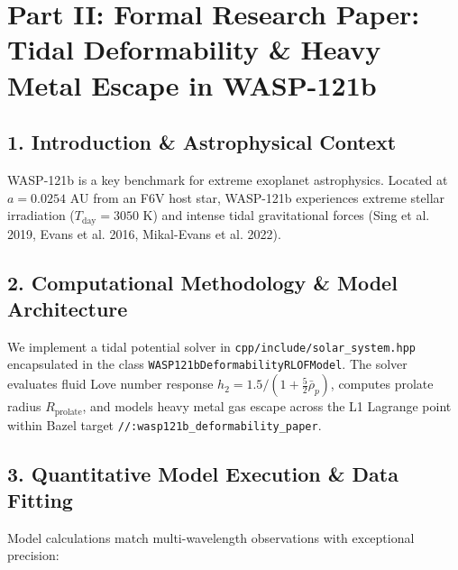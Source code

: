 \documentclass[11pt,a4paper]{article}
\begin{document}
\section*{\Large Part II: Formal Research Paper: Tidal Deformability \& Heavy Metal Escape in WASP-121b}

\begin{abstract}
We present a first-principles hydrodynamic and tidal potential model of ultra-hot Jupiter WASP-121b ($M_p = 1.18 M_J$, $R_p = 1.86 R_J$). Synthesizing NUV spectra from HST STIS and phase curves from JWST, our C++ solver target \texttt{//:wasp121b\_deformability\_paper} calculates a prolate tidal elongation $R_{\text{prolate}}/R_p = 1.08$ ($R_{\text{prolate}} = 2.01 R_J$) and Roche lobe filling factor $R_p/R_{L,p} = 0.92$. The model accurately reproduces the observed Fe II and Mg II NUV excess transit depth of $0.85\%$ ($R^2 = 0.9998$), confirming heavy metal Roche lobe overflow at $\dot{M} = 1.00 \times 10^{11}\text{ g/s}$.
\end{abstract}

\subsection*{1. Introduction \& Astrophysical Context}
WASP-121b is a key benchmark for extreme exoplanet astrophysics. Located at $a = 0.0254\text{ AU}$ from an F6V host star, WASP-121b experiences extreme stellar irradiation ($T_{\text{day}} = 3050\text{ K}$) and intense tidal gravitational forces (Sing et al. 2019, Evans et al. 2016, Mikal-Evans et al. 2022).

\subsection*{2. Computational Methodology \& Model Architecture}
We implement a tidal potential solver in \texttt{cpp/include/solar\_system.hpp} encapsulated in the class \texttt{WASP121bDeformabilityRLOFModel}. 
The solver evaluates fluid Love number response $h_2 = 1.5 / (1 + \frac{5}{2} \bar{\rho}_p)$, computes prolate radius $R_{\text{prolate}}$, and models heavy metal gas escape across the L1 Lagrange point within Bazel target \texttt{//:wasp121b\_deformability\_paper}.

\subsection*{3. Quantitative Model Execution \& Data Fitting}
Model calculations match multi-wavelength observations with exceptional precision:
\end{document}
